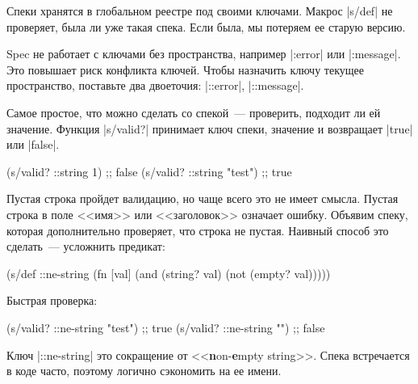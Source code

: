 \begin{english}
\end{english}

Спеки хранятся в глобальном реестре под своими ключами. Макрос \spverb|s/def| не
проверяет, была ли уже такая спека. Если была, мы потеряем ее старую версию.

Spec не работает с ключами без пространства, например \spverb|:error| или
\spverb|:message|. Это повышает риск конфликта ключей. Чтобы назначить ключу
текущее пространство, поставьте два двоеточия: \spverb|::error|,
\spverb|::message|.

Самое простое, что можно сделать со спекой~--- проверить, подходит ли ей
значение. Функция \spverb|s/valid?| принимает ключ спеки, значение и возвращает
\spverb|true| или \spverb|false|.

\begin{english}
  \begin{clojure}
(s/valid? ::string 1)      ;; false
(s/valid? ::string "test") ;; true
  \end{clojure}
\end{english}

Пустая строка пройдет валидацию, но чаще всего это не имеет смысла. Пустая
строка в поле <<имя>> или <<заголовок>> означает ошибку. Объявим спеку, которая
дополнительно проверяет, что строка не пустая. Наивный способ это сделать~---
усложнить предикат:

\begin{english}
  \begin{clojure}
(s/def ::ne-string
  (fn [val]
    (and (string? val)
         (not (empty? val)))))
  \end{clojure}
\end{english}

\noindent
Быстрая проверка:

\begin{english}
  \begin{clojure}
(s/valid? ::ne-string "test") ;; true
(s/valid? ::ne-string "")     ;; false
  \end{clojure}
\end{english}

Ключ \spverb|::ne-string| это сокращение от <<\textbf{n}on-\textbf{e}mpty
string>>. Спека встречается в коде часто, поэтому логично сэкономить на ее
имени.

